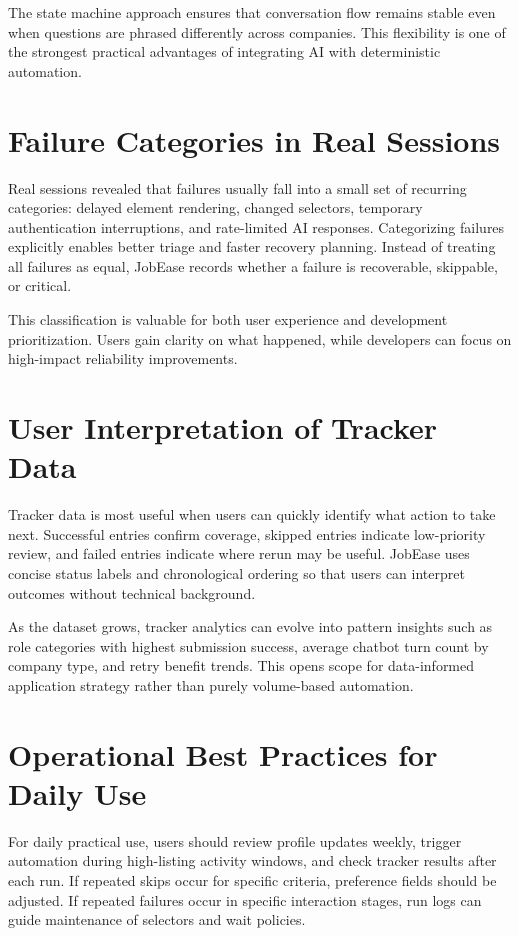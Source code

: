\documentclass[12pt,a4paper,oneside]{report}
\begin{document}
The state machine approach ensures that conversation flow remains stable even when questions are phrased differently across companies. This flexibility is one of the strongest practical advantages of integrating AI with deterministic automation.

\section{Failure Categories in Real Sessions}
Real sessions revealed that failures usually fall into a small set of recurring categories: delayed element rendering, changed selectors, temporary authentication interruptions, and rate-limited AI responses. Categorizing failures explicitly enables better triage and faster recovery planning. Instead of treating all failures as equal, JobEase records whether a failure is recoverable, skippable, or critical.

This classification is valuable for both user experience and development prioritization. Users gain clarity on what happened, while developers can focus on high-impact reliability improvements.

\section{User Interpretation of Tracker Data}
Tracker data is most useful when users can quickly identify what action to take next. Successful entries confirm coverage, skipped entries indicate low-priority review, and failed entries indicate where rerun may be useful. JobEase uses concise status labels and chronological ordering so that users can interpret outcomes without technical background.

As the dataset grows, tracker analytics can evolve into pattern insights such as role categories with highest submission success, average chatbot turn count by company type, and retry benefit trends. This opens scope for data-informed application strategy rather than purely volume-based automation.

\section{Operational Best Practices for Daily Use}
For daily practical use, users should review profile updates weekly, trigger automation during high-listing activity windows, and check tracker results after each run. If repeated skips occur for specific criteria, preference fields should be adjusted. If repeated failures occur in specific interaction stages, run logs can guide maintenance of selectors and wait policies.
\end{document}
